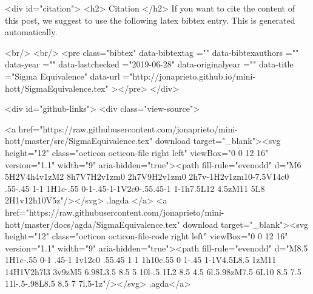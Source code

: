   
  <div id="citation">
  <h2> Citation </h2>
  If you want to cite the content of this post,
  we suggest to use the following latex bibtex entry.
  This is generated automatically.

  <br/>
  <br/>
  <pre class="bibtex"
       data-bibtextag =""
       data-bibtexauthors =""
       data-year =""
       data-lastchecked ="2019-06-28"
       data-originalyear =""
       data-title ="Sigma Equivalence"
       data-url ="http://jonaprieto.github.io/mini-hott/SigmaEquivalence.tex"
  ></pre>
  </div>
  

  <div id="github-links">
    <div class="view-source">
      
        <a href="https://raw.githubusercontent.com/jonaprieto/mini-hott/master/src/SigmaEquivalence.tex" download target="_blank"><svg height="12" class="octicon octicon-file right left" viewBox="0 0 12 16" version="1.1" width="9" aria-hidden="true"><path fill-rule="evenodd" d="M6 5H2V4h4v1zM2 8h7V7H2v1zm0 2h7V9H2v1zm0 2h7v-1H2v1zm10-7.5V14c0 .55-.45 1-1 1H1c-.55 0-1-.45-1-1V2c0-.55.45-1 1-1h7.5L12 4.5zM11 5L8 2H1v12h10V5z"/></svg> .lagda </a>
        <a href="https://raw.githubusercontent.com/jonaprieto/mini-hott/master/docs/agda/SigmaEquivalence.tex" download target="_blank"><svg height="12" class="octicon octicon-file-code right left" viewBox="0 0 12 16" version="1.1" width="9" aria-hidden="true"><path fill-rule="evenodd" d="M8.5 1H1c-.55 0-1 .45-1 1v12c0 .55.45 1 1 1h10c.55 0 1-.45 1-1V4.5L8.5 1zM11 14H1V2h7l3 3v9zM5 6.98L3.5 8.5 5 10l-.5 1L2 8.5 4.5 6l.5.98zM7.5 6L10 8.5 7.5 11l-.5-.98L8.5 8.5 7 7l.5-1z"/></svg> .agda</a>
      
